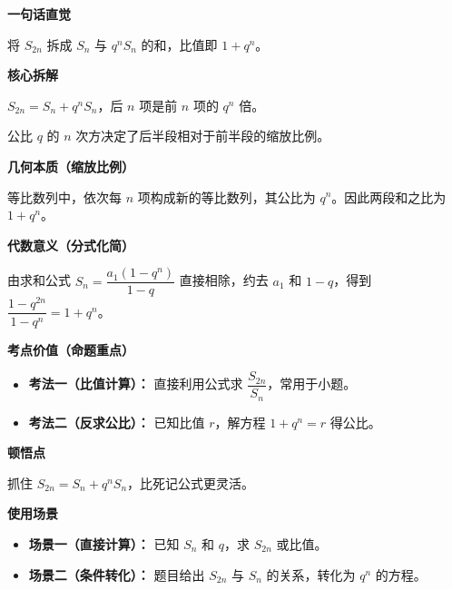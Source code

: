 \begin{explanationbox}
	\textbf{\textcolor{CExplanation}{一句话直觉}}

	将 $S_{2n}$ 拆成 $S_n$ 与 $q^nS_n$ 的和，比值即 $1+q^n$。

	\medskip
	\textbf{\textcolor{CExplanation}{核心拆解}}
	\begin{description}[style=nextline, leftmargin=2.8em, labelsep=0.5em, itemsep=0.45em]
		\item[\textbf{要点一（和式拆分）：}] $S_{2n}=S_n+q^nS_n$，后 $n$ 项是前 $n$ 项的 $q^n$ 倍。
		\item[\textbf{要点二（公比作用）：}] 公比 $q$ 的 $n$ 次方决定了后半段相对于前半段的缩放比例。
	\end{description}

	\medskip
	\textbf{\textcolor{CExplanation}{几何本质（缩放比例）}}

	等比数列中，依次每 $n$ 项构成新的等比数列，其公比为 $q^n$。因此两段和之比为 $1+q^n$。

	\medskip
	\textbf{\textcolor{CExplanation}{代数意义（分式化简）}}

	由求和公式 $S_n=\dfrac{a_1(1-q^n)}{1-q}$ 直接相除，约去 $a_1$ 和 $1-q$，得到 $\dfrac{1-q^{2n}}{1-q^n}=1+q^n$。

	\medskip
	\textbf{\textcolor{CExplanation}{考点价值（命题重点）}}
	\begin{itemize}[leftmargin=*, itemsep=0.5em, topsep=0.4em]
		\item \textbf{考法一（比值计算）：} 直接利用公式求 $\dfrac{S_{2n}}{S_n}$，常用于小题。
		\item \textbf{考法二（反求公比）：} 已知比值 $r$，解方程 $1+q^n=r$ 得公比。
	\end{itemize}

	\medskip
	\textbf{\textcolor{CExplanation}{顿悟点}}

	抓住 $S_{2n}=S_n+q^nS_n$，比死记公式更灵活。

	\medskip
	\textbf{\textcolor{CExplanation}{使用场景}}
	\begin{itemize}[leftmargin=*, itemsep=0.5em, topsep=0.4em]
		\item \textbf{场景一（直接计算）：} 已知 $S_n$ 和 $q$，求 $S_{2n}$ 或比值。
		\item \textbf{场景二（条件转化）：} 题目给出 $S_{2n}$ 与 $S_n$ 的关系，转化为 $q^n$ 的方程。
	\end{itemize}
\end{explanationbox}
